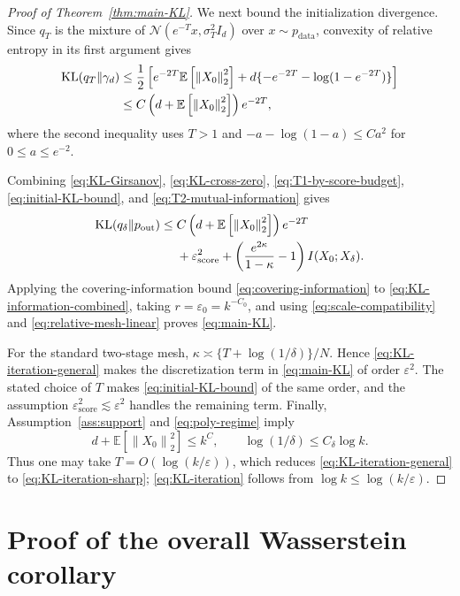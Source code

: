\documentclass[11pt]{article}
\theoremstyle{definition}
\newcommand{\E}{\mathbb{E}}
\newcommand{\N}{\mathcal{N}}
\newcommand{\Id}{I_d}
\newcommand{\pdata}{p_{\mathrm{data}}}
\newcommand{\norm}[1]{\left\lVert #1\right\rVert_2}
\newcommand{\KL}{\operatorname{KL}}
\newcommand{\scoreerr}{\varepsilon_{\mathrm{score}}}
\begin{document}
\begin{proof}[Proof of Theorem~\ref{thm:main-KL}]
We next bound the initialization divergence. Since $q_T$ is the
mixture of
$\N(e^{-T}x,\sigma_T^2\Id)$ over $x\sim\pdata$, convexity of relative
entropy in its first argument gives
\begin{align}
    \KL(q_T\Vert\gamma_d)
    \le{}&
    \frac12\left[
       e^{-2T}\E\left[\norm{X_0}^2\right]
       +d\{-e^{-2T}-\log(1-e^{-2T})\}
    \right]
    \notag\\
    \le{}&
    C\left(d+\E\left[\norm{X_0}^2\right]\right)e^{-2T},
    \label{eq:initial-KL-bound}
\end{align}
where the second inequality uses $T>1$ and
$-a-\log(1-a)\le Ca^2$ for $0\le a\le e^{-2}$.

Combining \eqref{eq:KL-Girsanov}, \eqref{eq:KL-cross-zero},
\eqref{eq:T1-by-score-budget}, \eqref{eq:initial-KL-bound}, and
\eqref{eq:T2-mutual-information} gives
\begin{align}
    \KL(q_\delta\Vert p_{\mathrm{out}})
    \le{}&
    C\left(d+\E\left[\norm{X_0}^2\right]\right)e^{-2T}\notag\\
    &+\scoreerr^2
    +\left(\frac{e^{2\kappa}}{1-\kappa}-1\right)
    I(X_0;X_\delta).
\label{eq:KL-information-combined}
\end{align}
Applying the covering-information bound
\eqref{eq:covering-information} to
\eqref{eq:KL-information-combined}, taking
$r=\varepsilon_0=k^{-C_0}$, and using
\eqref{eq:scale-compatibility} and
\eqref{eq:relative-mesh-linear} proves \eqref{eq:main-KL}.

For the standard two-stage mesh,
$\kappa\asymp\{T+\log(1/\delta)\}/N$. Hence
\eqref{eq:KL-iteration-general} makes the discretization term in
\eqref{eq:main-KL} of order $\varepsilon^2$. The stated choice of
$T$ makes \eqref{eq:initial-KL-bound} of the same order, and the
assumption $\scoreerr^2\lesssim\varepsilon^2$ handles the remaining
term. Finally, Assumption~\ref{ass:support} and
\eqref{eq:poly-regime} imply
\[
    d+\E\left[\norm{X_0}^2\right]\le k^C,
    \qquad
    \log(1/\delta)\le C_\delta\log k.
\]
Thus one may take $T=O(\log(k/\varepsilon))$, which reduces
\eqref{eq:KL-iteration-general} to
\eqref{eq:KL-iteration-sharp}; \eqref{eq:KL-iteration} follows from
$\log k\le\log(k/\varepsilon)$.
\end{proof}

\section{Proof of the overall Wasserstein corollary}
\label{app:overall-W2}
\end{document}

